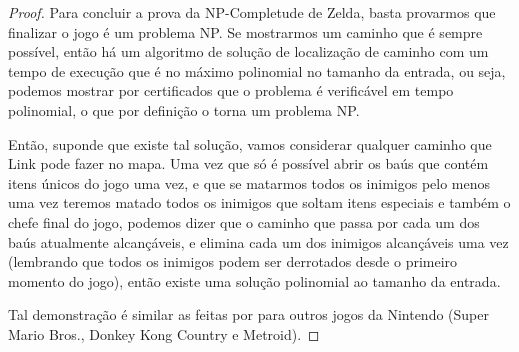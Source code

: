 \begin{proof}
    Para concluir a prova da NP-Completude de Zelda, basta provarmos que finalizar o jogo é um problema NP.
    Se mostrarmos um caminho que é sempre possível,
    então há um algoritmo de solução de localização de caminho com um tempo de execução que é
    no máximo polinomial no tamanho da entrada, ou seja,
    podemos mostrar por certificados que o problema é verificável em tempo polinomial, o que por definição o torna um problema NP.
    
    Então, suponde que existe tal solução, vamos considerar qualquer caminho que Link pode fazer no mapa.
    Uma vez que só é possível abrir os baús que contém itens únicos do jogo uma vez, e que se matarmos
    todos os inimigos pelo menos uma vez teremos matado todos os inimigos que soltam itens especiais e também o chefe final do jogo, podemos dizer que
    o caminho que passa por cada um dos baús atualmente alcançáveis, e elimina cada um dos inimigos alcançáveis
    uma vez (lembrando que todos os inimigos podem ser derrotados desde o primeiro momento do jogo), então
    existe uma solução polinomial ao tamanho da entrada.
    
    Tal demonstração é similar as feitas por \cite{gabrielsen2012video} para outros jogos da Nintendo
    (Super Mario Bros., Donkey Kong Country e Metroid).

\end{proof}    


